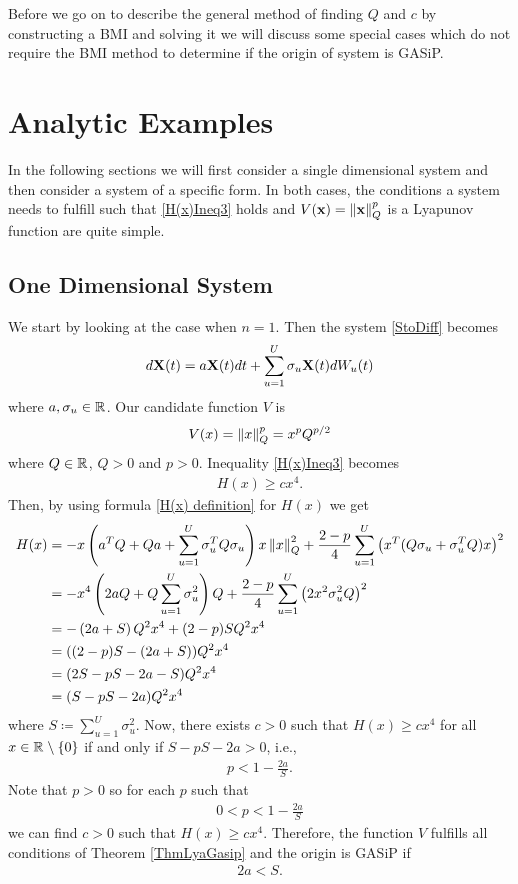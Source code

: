 \documentclass[a4paper,12pt,twoside,BCOR=10mm]{scrbook}
\begin{document}
Before we go on to describe the general method of finding $Q$ and $c$ by constructing a BMI and solving it we will discuss some special cases which do not require the BMI method to determine if the origin of system is GASiP.

\section{Analytic Examples}\label{SectionAnalyticExamples}
In the following sections we will first consider a single dimensional system and then consider a system of a specific form. In both cases, the conditions a system needs to fulfill such that \eqref{H(x)Ineq3} holds and $V(\mathbf{x}) = \left\lVert\mathbf{x}\right\rVert_Q^p$ is a Lyapunov function are quite simple.


\subsection{One Dimensional System}
We start by looking at the case when $n = 1$. Then the system \eqref{StoDiff} becomes
\begin{align}\label{SDE 1d}
    d\mathbf{X}(t) = a\mathbf{X}(t)dt + \sum_{u = 1}^U \sigma_u \mathbf{X}(t) dW_u(t)
\end{align}
where $a, \sigma_u \in \mathbb{R}^{}$. Our candidate function $V$ is
\begin{align*}
    V(x) = \left\lVert x\right\rVert_Q^p = x^p Q^{p/2}
\end{align*}
where $Q\in \mathbb{R}^{}$, $Q > 0$ and $p > 0$. Inequality \eqref{H(x)Ineq3} becomes
\begin{align*}
    H(x) \geq cx^4.
\end{align*}
Then, by using formula \eqref{H(x) definition} for $H(x)$ we get
\begin{align*}
    H(x) &= -x\left(a^T Q + Qa + \sum_{u = 1}^U \sigma_u^T Q \sigma_u \right)x \left\lVert x\right\rVert_{Q}^{2} + \frac{2 - p}{4} \sum_{u = 1}^U \left(x^T (Q\sigma_u + \sigma_u^T Q) x\right)^2\\
    &= -x^4\left(2a Q + Q\sum_{u = 1}^U \sigma_u^2\right)Q + \frac{2 - p}{4} \sum_{u = 1}^U\left(2x^2\sigma_u^2 Q\right)^2\\
    &= -\left(2a + S\right) Q^2x^4 + (2 - p)SQ^2x^4\\
    &= ((2-p)S - (2a + S))Q^2 x^4\\
    &= (2S - pS - 2a - S) Q^2 x^4\\
    &= (S - pS - 2a)Q^2 x^4
\end{align*}
where $S \coloneqq \sum\limits_{u = 1}^U \sigma_u^2$. Now, there exists $c > 0$ such that $H(x) \geq cx^4$ for all $x \in \mathbb{R}^{}\setminus \{0\}$ if and only if $S - pS - 2a > 0$, i.e.,
\begin{align*}
    p < 1 - \frac{2a}{S}.
\end{align*}
Note that $p > 0$ so for each $p$ such that
\begin{align*}
    0 < p < 1 - \frac{2a}{S}
\end{align*}
we can find $c > 0$ such that $H(x) \geq cx^4$. Therefore, the function $V$ fulfills all conditions of Theorem \ref{ThmLyaGasip} and the origin is GASiP if
\begin{align*}
    2a < S.
\end{align*}
\end{document}
